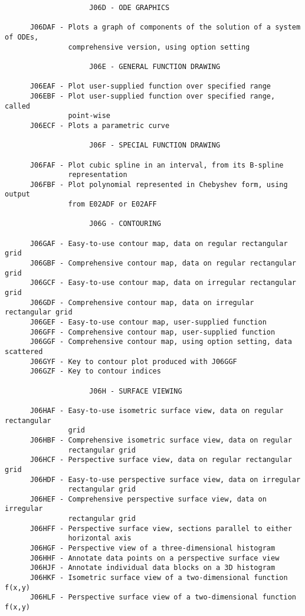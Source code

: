 \begin{verbatim}
                    J06D - ODE GRAPHICS
 
      J06DAF - Plots a graph of components of the solution of a system of ODEs,
               comprehensive version, using option setting
 
                    J06E - GENERAL FUNCTION DRAWING
 
      J06EAF - Plot user-supplied function over specified range
      J06EBF - Plot user-supplied function over specified range, called
               point-wise
      J06ECF - Plots a parametric curve
 
                    J06F - SPECIAL FUNCTION DRAWING
 
      J06FAF - Plot cubic spline in an interval, from its B-spline
               representation
      J06FBF - Plot polynomial represented in Chebyshev form, using output
               from E02ADF or E02AFF
 
                    J06G - CONTOURING
 
      J06GAF - Easy-to-use contour map, data on regular rectangular grid
      J06GBF - Comprehensive contour map, data on regular rectangular grid
      J06GCF - Easy-to-use contour map, data on irregular rectangular grid
      J06GDF - Comprehensive contour map, data on irregular rectangular grid
      J06GEF - Easy-to-use contour map, user-supplied function
      J06GFF - Comprehensive contour map, user-supplied function
      J06GGF - Comprehensive contour map, using option setting, data scattered
      J06GYF - Key to contour plot produced with J06GGF
      J06GZF - Key to contour indices
 
                    J06H - SURFACE VIEWING
 
      J06HAF - Easy-to-use isometric surface view, data on regular rectangular
               grid
      J06HBF - Comprehensive isometric surface view, data on regular
               rectangular grid
      J06HCF - Perspective surface view, data on regular rectangular grid
      J06HDF - Easy-to-use perspective surface view, data on irregular
               rectangular grid
      J06HEF - Comprehensive perspective surface view, data on irregular
               rectangular grid
      J06HFF - Perspective surface view, sections parallel to either
               horizontal axis
      J06HGF - Perspective view of a three-dimensional histogram
      J06HHF - Annotate data points on a perspective surface view
      J06HJF - Annotate individual data blocks on a 3D histogram
      J06HKF - Isometric surface view of a two-dimensional function f(x,y)
      J06HLF - Perspective surface view of a two-dimensional function f(x,y)
 

\end{verbatim}
